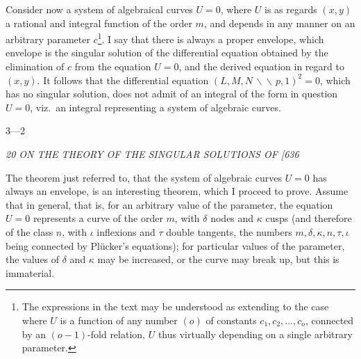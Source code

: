 \documentclass[12pt,a4paper]{article}
\begin{document}
Consider now a system of algebraical curves $U = 0$, where $U$ is as regards $(x, y)$ a rational and integral function of the order $m$, and depends in any manner on an arbitrary parameter $c$\footnote{The expressions in the text may be understood as extending to the case where $U$ is a function of any number $(o)$ of constants $c_1, c_2, \ldots, c_o$, connected by an $(o-1)$-fold relation, $U$ thus virtually depending on a single arbitrary parameter.}. I say that there is always a proper envelope, which envelope is the singular solution of the differential equation obtained by the elimination of $c$ from the equation $U = 0$, and the derived equation in regard to $(x, y)$. It follows that the differential equation $(L, M, N\,\backslash\!\backslash\, p, 1)^2 = 0$, which has no singular solution, does not admit of an integral of the form in question $U = 0$, viz.\ an integral representing a system of algebraic curves.

\hfill 3---2

\clearpage
\setcounter{page}{20}

\begin{center}
\textit{20 \hfill ON THE THEORY OF THE SINGULAR SOLUTIONS OF \hfill [636}
\end{center}

The theorem just referred to, that the system of algebraic curves $U = 0$ has always an envelope, is an interesting theorem, which I proceed to prove. Assume that in general, that is, for an arbitrary value of the parameter, the equation $U = 0$ represents a curve of the order $m$, with $\delta$ nodes and $\kappa$ cusps (and therefore of the class $n$, with $\iota$ inflexions and $\tau$ double tangents, the numbers $m, \delta, \kappa, n, \tau, \iota$ being connected by Pl\"ucker's equations); for particular values of the parameter, the values of $\delta$ and $\kappa$ may be increased, or the curve may break up, but this is immaterial.
\end{document}
